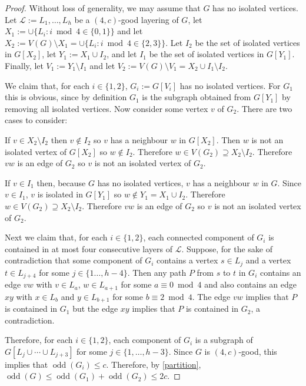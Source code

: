 \documentclass{patmorin}
\DeclareMathOperator{\odd}{odd}
\begin{document}
\begin{proof}
  Without loss of generality, we may assume that $G$ has no isolated vertices.
  Let $\mathcal{L}:=L_1,\ldots,L_h$ be a $(4,c)$-good layering of $G$,
  let $X_1:=\cup\{L_i:i\bmod 4\in\{0,1\}\}$ and let $X_2:=V(G)\setminus X_1=\cup\{L_i:i\bmod 4\in\{2,3\}\}$.  Let $I_2$ be the set of isolated vertices in $G[X_2]$, let $Y_1:=X_1\cup I_2$, and let $I_1$ be the set of isolated vertices in $G[Y_1]$.  Finally, let $V_1:=Y_1\setminus I_1$ and let $V_2:=V(G)\setminus V_1=X_2\cup I_1\setminus I_2$.

  We claim that, for each $i\in\{1,2\}$, $G_i:=G[V_i]$ has no isolated vertices. For $G_1$ this is obvious, since by definition $G_1$ is the subgraph obtained from $G[Y_1]$ by removing all isolated vertices.  Now consider some vertex $v$ of $G_2$. There are two cases to consider:
  \begin{compactenum}
    \item If $v\in X_2\setminus I_2$ then $v\not\in I_2$ so $v$ has a neighbour $w$ in $G[X_2]$.  Then $w$ is not an isolated vertex of $G[X_2]$ so $w\not\in I_2$.  Therefore $w\in V(G_2)\supseteq X_2\setminus I_2$. Therefore $vw$ is an edge of $G_2$ so $v$ is not an isolated vertex of $G_2$.
    \item If $v\in I_1$ then, because $G$ has no isolated vertices, $v$ has a neighbour $w$ in $G$.  Since $v\in I_1$, $v$ is isolated in $G[Y_1]$ so $w\not\in Y_1= X_1\cup I_2$. Therefore $w\in V(G_2)\supseteq X_2\setminus I_2$.  Therefore $vw$ is an edge of $G_2$ so $v$ is not an isolated vertex of $G_2$.
  \end{compactenum}
  Next we claim that, for each $i\in\{1,2\}$, each connected component of $G_i$ is contained in at most four consecutive layers of $\mathcal{L}$.  Suppose, for the sake of contradiction that some component of $G_i$ contains a vertex $s\in L_j$ and a vertex $t\in L_{j+4}$ for some $j\in\{1\ldots,h-4\}$.  Then any path $P$ from $s$ to $t$ in $G_i$ contains an edge $vw$ with $v\in L_a$, $w\in L_{a+1}$ for some $a\equiv 0\bmod 4$ and also contains an edge $xy$ with $x\in L_b$ and $y\in L_{b+1}$ for some $b\equiv 2\bmod 4$.  The edge $vw$ implies that $P$ is contained in $G_1$ but the edge $xy$ implies that $P$ is contained in $G_2$, a contradiction.

  Therefore, for each $i\in\{1,2\}$, each component of $G_i$ is a subgraph of $G[L_j\cup\cdots\cup L_{j+3}]$ for some $j\in\{1,\ldots,h-3\}$.  Since $G$ is $(4,c)$-good, this implies that $\odd(G_i)\le c$.  Therefore, by \cref{partition}, $\odd(G)\le \odd(G_1)+\odd(G_2)\le 2c$.
\end{proof}
\end{document}
